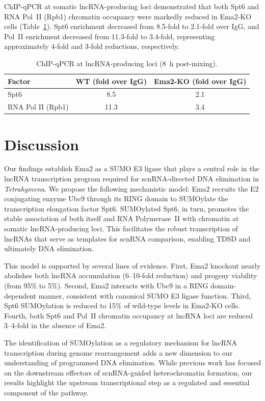\documentclass[11pt]{article}
\begin{document}
ChIP-qPCR at somatic lncRNA-producing loci demonstrated that both Spt6 and RNA Pol~II (Rpb1) chromatin occupancy were markedly reduced in Ema2-KO cells (Table~\ref{tab:chip}). Spt6 enrichment decreased from 8.5-fold to 2.1-fold over IgG, and Pol~II enrichment decreased from 11.3-fold to 3.4-fold, representing approximately 4-fold and 3-fold reductions, respectively.

\begin{table}[ht]
\centering
\caption{ChIP-qPCR at lncRNA-producing loci (8~h post-mixing).}
\label{tab:chip}
\begin{tabular}{lcc}
\toprule
\textbf{Factor} & \textbf{WT (fold over IgG)} & \textbf{Ema2-KO (fold over IgG)} \\
\midrule
Spt6 & 8.5 & 2.1 \\
RNA Pol II (Rpb1) & 11.3 & 3.4 \\
\bottomrule
\end{tabular}
\end{table}

\section{Discussion}

Our findings establish Ema2 as a SUMO E3 ligase that plays a central role in the lncRNA transcription program required for scnRNA-directed DNA elimination in \textit{Tetrahymena}. We propose the following mechanistic model: Ema2 recruits the E2 conjugating enzyme Ubc9 through its RING domain to SUMOylate the transcription elongation factor Spt6. SUMOylated Spt6, in turn, promotes the stable association of both itself and RNA Polymerase~II with chromatin at somatic lncRNA-producing loci. This facilitates the robust transcription of lncRNAs that serve as templates for scnRNA comparison, enabling TDSD and ultimately DNA elimination.

This model is supported by several lines of evidence. First, Ema2 knockout nearly abolishes both lncRNA accumulation (6--10-fold reduction) and progeny viability (from 95\% to 5\%). Second, Ema2 interacts with Ubc9 in a RING domain-dependent manner, consistent with canonical SUMO E3 ligase function. Third, Spt6 SUMOylation is reduced to 15\% of wild-type levels in Ema2-KO cells. Fourth, both Spt6 and Pol~II chromatin occupancy at lncRNA loci are reduced 3--4-fold in the absence of Ema2.

The identification of SUMOylation as a regulatory mechanism for lncRNA transcription during genome rearrangement adds a new dimension to our understanding of programmed DNA elimination. While previous work has focused on the downstream effectors of scnRNA-guided heterochromatin formation, our results highlight the upstream transcriptional step as a regulated and essential component of the pathway.
\end{document}
